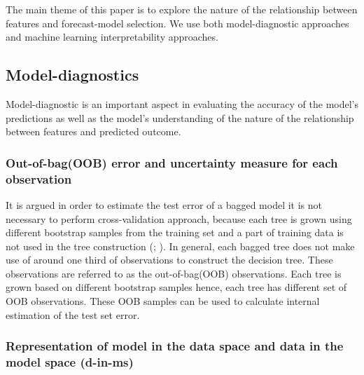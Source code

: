 \documentclass[11pt,a4paper,]{article}
\theoremstyle{definition}
\theoremstyle{definition}
\theoremstyle{definition}
\theoremstyle{remark}
\begin{document}
The main theme of this paper is to explore the nature of the
relationship between features and forecast-model selection. We use both
model-diagnostic approaches and machine learning interpretability
approaches.

\subsection{Model-diagnostics}\label{model-diagnostics}

Model-diagnostic is an important aspect in evaluating the accuracy of
the model's predictions as well as the model's understanding of the
nature of the relationship between features and predicted outcome.

\subsubsection{Out-of-bag(OOB) error and uncertainty measure for each
observation}\label{out-of-bagoob-error-and-uncertainty-measure-for-each-observation}

It is argued in order to estimate the test error of a bagged model it is
not necessary to perform cross-validation approach, because each tree is
grown using different bootstrap samples from the training set and a part
of training data is not used in the tree construction
(\textcite{breiman2001random}; \textcite{chen2004using}). In general,
each bagged tree does not make use of around one third of observations
to construct the decision tree. These observations are referred to as
the out-of-bag(OOB) observations. Each tree is grown based on different
bootstrap samples hence, each tree has different set of OOB
observations. These OOB samples can be used to calculate internal
estimation of the test set error.

\subsubsection{Representation of model in the data space and data in the
model space
(d-in-ms)}\label{representation-of-model-in-the-data-space-and-data-in-the-model-space-d-in-ms}
\end{document}
